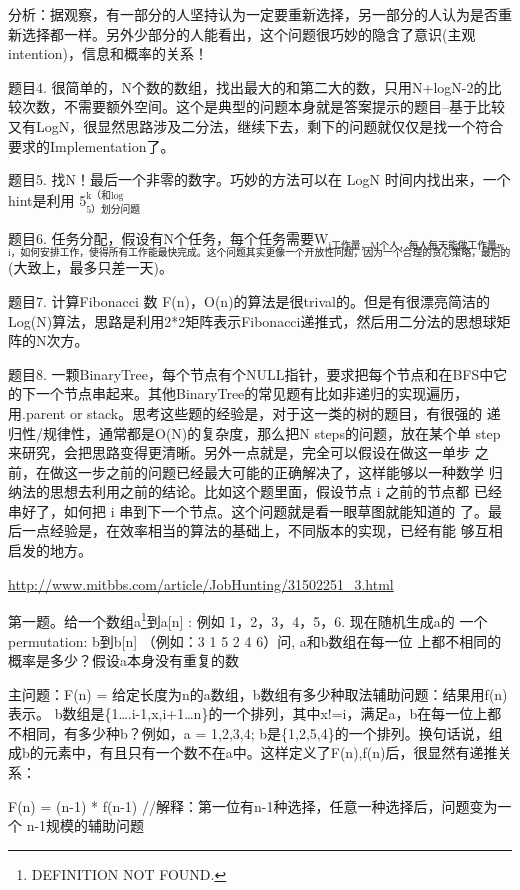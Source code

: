 \documentclass[12pt]{book}
\begin{document}
分析：据观察，有一部分的人坚持认为一定要重新选择，另一部分的人认为是否重新选择都一样。另外少部分的人能看出，这个问题很巧妙的隐含了意识(主观intention)，信息和概率的关系！

题目4. 很简单的，N个数的数组，找出最大的和第二大的数，只用N+logN-2的比较次数，不需要额外空间。这个是典型的问题本身就是答案提示的题目--基于比较又有LogN，很显然思路涉及二分法，继续下去，剩下的问题就仅仅是找一个符合要求的Implementation了。

题目5. 找N！最后一个非零的数字。巧妙的方法可以在 LogN 时间内找出来，一个hint是利用 5$^{\text{k（和log}}_{\text{5）划分问题}}$

题目6. 任务分配，假设有N个任务，每个任务需要W$_{\text{i工作量，M个人，每人每天能做工作量w}}$$_{\text{i，如何安排工作，使得所有工作能最快完成。这个问题其实更像一个开放性问题，因为一个合理的贪心策略，最后的结果跟最优结是很接近的}}$(大致上，最多只差一天)。

题目7. 计算Fibonacci 数 F(n)，O(n)的算法是很trival的。但是有很漂亮简洁的Log(N)算法，思路是利用2*2矩阵表示Fibonacci递推式，然后用二分法的思想球矩阵的N次方。

题目8. 一颗BinaryTree，每个节点有个NULL指针，要求把每个节点和在BFS中它
的下一个节点串起来。其他BinaryTree的常见题有比如非递归的实现遍历，
用.parent or stack。思考这些题的经验是，对于这一类的树的题目，有很强的
递归性/规律性，通常都是O(N)的复杂度，那么把N steps的问题，放在某个单
step来研究，会把思路变得更清晰。另外一点就是，完全可以假设在做这一单步
之前，在做这一步之前的问题已经最大可能的正确解决了，这样能够以一种数学
归纳法的思想去利用之前的结论。比如这个题里面，假设节点 i 之前的节点都
已经串好了，如何把 i 串到下一个节点。这个问题就是看一眼草图就能知道的
了。最后一点经验是，在效率相当的算法的基础上，不同版本的实现，已经有能
够互相启发的地方。

\url{http://www.mitbbs.com/article/JobHunting/31502251_3.html}

第一题。给一个数组a\footnote{DEFINITION NOT FOUND.}到a[n] : 例如 1，2，3，4，5，6. 现在随机生成a的
一个permutation: b\footnotemark[2]{}到b[n] （例如：3 1 5 2 4 6）问, a和b数组在每一位
上都不相同的概率是多少？假设a本身没有重复的数 

主问题：F(n) = 给定长度为n的a数组，b数组有多少种取法辅助问题：结果用f(n)表示。 b数组是\{1….i-1,x,i+1…n\}的一个排列，其中x!=i，满足a，b在每一位上都不相同，有多少种b？例如，a = 1,2,3,4; b是\{1,2,5,4\}的一个排列。换句话说，组成b的元素中，有且只有一个数不在a中。这样定义了F(n),f(n)后，很显然有递推关系：

F(n) = (n-1) * f(n-1)    //解释：第一位有n-1种选择，任意一种选择后，问题变为一个 n-1规模的辅助问题
\end{document}
